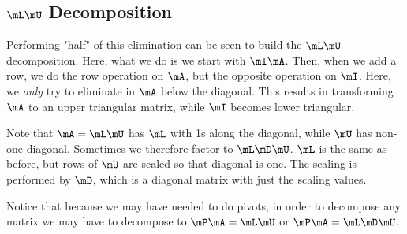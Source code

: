 \subsection{\texorpdfstring{$\mL\mU$}{LU} Decomposition}

Performing "half" of this elimination can be seen to build the $\mL\mU$
decomposition. Here, what we do is we start with $\mI\mA$. Then, when we
add a row, we do the row operation on $\mA$, but the opposite operation
on $\mI$. Here, we \emph{only} try to eliminate in $\mA$ below the
diagonal. This results in transforming $\mA$ to an upper triangular
matrix, while $\mI$ becomes lower triangular.

Note that $\mA = \mL\mU$ has $\mL$ with 1s along the diagonal, while
$\mU$ has non-one diagonal. Sometimes we therefore factor to
$\mL\mD\mU$. $\mL$ is the same as before, but rows of $\mU$ are scaled
so that diagonal is one. The scaling is performed by $\mD$, which is a
diagonal matrix with just the scaling values.

Notice that because we may have needed to do pivots, in order to
decompose any matrix we may have to decompose to $\mP\mA = \mL\mU$ or
$\mP\mA=\mL\mD\mU$.
